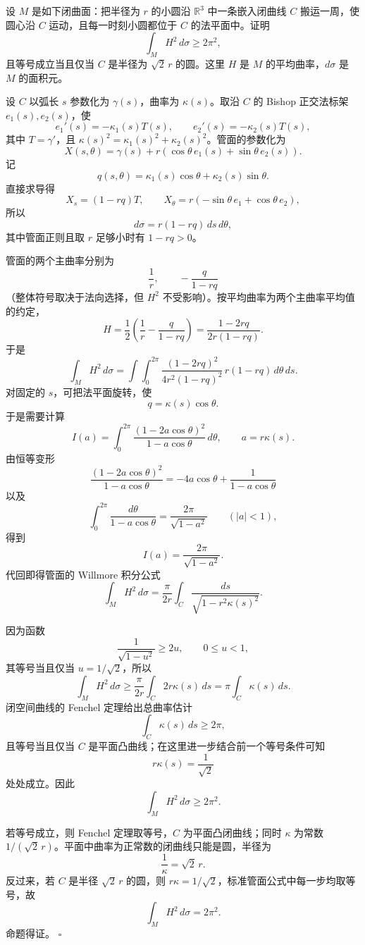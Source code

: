 \documentclass[UTF8,12pt]{ctexart}
\newcommand{\R}{\mathbb R}
\newcounter{problem}
\newenvironment{problem}[1][]{%
  \refstepcounter{problem}
  \par\bigskip
  \noindent{\large\bfseries 题目 \theproblem\if\relax\detokenize{#1}\relax\else\quad #1\fi}\par
  \smallskip
  \noindent\ignorespaces
}{\par}
\newenvironment{solution}{%
  \par\medskip
  \noindent{\bfseries 解答}\quad\ignorespaces
}{\hfill$\square$\par\medskip}
\begin{document}
\begin{problem}
设 \(M\) 是如下闭曲面：把半径为 \(r\) 的小圆沿 \(\R^3\) 中一条嵌入闭曲线 \(C\) 搬运一周，使圆心沿 \(C\) 运动，且每一时刻小圆都位于 \(C\) 的法平面中。证明
\[
\int_M H^2\,d\sigma\ge 2\pi^2,
\]
且等号成立当且仅当 \(C\) 是半径为 \(\sqrt2\,r\) 的圆。这里 \(H\) 是 \(M\) 的平均曲率，\(d\sigma\) 是 \(M\) 的面积元。
\end{problem}

\begin{solution}
设 \(C\) 以弧长 \(s\) 参数化为 \(\gamma(s)\)，曲率为 \(\kappa(s)\)。取沿 \(C\) 的 Bishop 正交法标架 \(e_1(s),e_2(s)\)，使
\[
e_1'(s)=-\kappa_1(s)T(s),\qquad e_2'(s)=-\kappa_2(s)T(s),
\]
其中 \(T=\gamma'\)，且 \(\kappa(s)^2=\kappa_1(s)^2+\kappa_2(s)^2\)。管面的参数化为
\[
X(s,\theta)=\gamma(s)+r(\cos\theta\,e_1(s)+\sin\theta\,e_2(s)).
\]
记
\[
q(s,\theta)=\kappa_1(s)\cos\theta+\kappa_2(s)\sin\theta.
\]
直接求导得
\[
X_s=(1-rq)T,\qquad
X_\theta=r(-\sin\theta\,e_1+\cos\theta\,e_2),
\]
所以
\[
d\sigma=r(1-rq)\,ds\,d\theta,
\]
其中管面正则且取 \(r\) 足够小时有 \(1-rq>0\)。

管面的两个主曲率分别为
\[
\frac1r,\qquad -\frac{q}{1-rq}
\]
（整体符号取决于法向选择，但 \(H^2\) 不受影响）。按平均曲率为两个主曲率平均值的约定，
\[
H=\frac12\left(\frac1r-\frac{q}{1-rq}\right)
=\frac{1-2rq}{2r(1-rq)}.
\]
于是
\[
\int_M H^2\,d\sigma
=\int \int_0^{2\pi}
\frac{(1-2rq)^2}{4r^2(1-rq)^2}\,r(1-rq)\,d\theta\,ds.
\]
对固定的 \(s\)，可把法平面旋转，使
\[
q=\kappa(s)\cos\theta.
\]
于是需要计算
\[
I(a)=\int_0^{2\pi}\frac{(1-2a\cos\theta)^2}{1-a\cos\theta}\,d\theta,
\qquad a=r\kappa(s).
\]
由恒等变形
\[
\frac{(1-2a\cos\theta)^2}{1-a\cos\theta}
=-4a\cos\theta+\frac{1}{1-a\cos\theta}
\]
以及
\[
\int_0^{2\pi}\frac{d\theta}{1-a\cos\theta}
=\frac{2\pi}{\sqrt{1-a^2}}\qquad (|a|<1),
\]
得到
\[
I(a)=\frac{2\pi}{\sqrt{1-a^2}}.
\]
代回即得管面的 Willmore 积分公式
\[
\int_M H^2\,d\sigma
=\frac{\pi}{2r}\int_C\frac{ds}{\sqrt{1-r^2\kappa(s)^2}}.
\]

因为函数
\[
\frac1{\sqrt{1-u^2}}\ge 2u,\qquad 0\le u<1,
\]
其等号当且仅当 \(u=1/\sqrt2\)，所以
\[
\int_M H^2\,d\sigma
\ge \frac{\pi}{2r}\int_C 2r\kappa(s)\,ds
=\pi\int_C\kappa(s)\,ds.
\]
闭空间曲线的 Fenchel 定理给出总曲率估计
\[
\int_C\kappa(s)\,ds\ge 2\pi,
\]
且等号当且仅当 \(C\) 是平面凸曲线；在这里进一步结合前一个等号条件可知
\[
r\kappa(s)=\frac1{\sqrt2}
\]
处处成立。因此
\[
\int_M H^2\,d\sigma\ge 2\pi^2.
\]

若等号成立，则 Fenchel 定理取等号，\(C\) 为平面凸闭曲线；同时 \(\kappa\) 为常数 \(1/(\sqrt2\,r)\)。平面中曲率为正常数的闭曲线只能是圆，半径为
\[
\frac1\kappa=\sqrt2\,r.
\]
反过来，若 \(C\) 是半径 \(\sqrt2\,r\) 的圆，则 \(r\kappa=1/\sqrt2\)，标准管面公式中每一步均取等号，故
\[
\int_M H^2\,d\sigma=2\pi^2.
\]
命题得证。
\end{solution}
\end{document}
